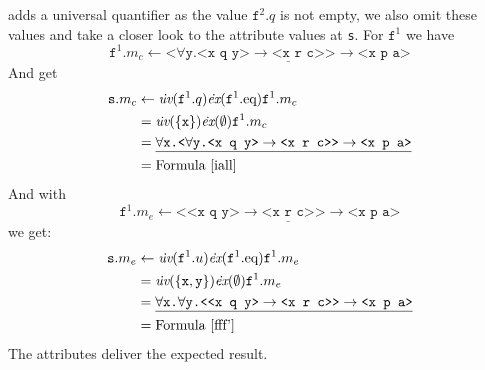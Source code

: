 adds a universal quantifier as the value $\texttt{f}^2.q$ is not empty, we also omit these values and take a closer look to the attribute values at \texttt{s}.
For $\texttt{f}^1$ we have \[\texttt{f}^1.m_c\leftarrow \underline{\texttt{<}\forall \texttt{y.<x q y>}\rightarrow\texttt{<x r c>{}>}\rightarrow \texttt{<x p a>}}\]
And get
\begin{align*}
\notag \texttt{s}.m_c&\leftarrow \dot{\textit{uv}}(\texttt{f}^1.q) \dot{\textit{ex}}(\texttt{f}^1.\text{eq}) \texttt{f}^1.m_c\\
\notag &=\dot{\textit{uv}}(\{\texttt{x}\}) \dot{\textit{ex}}(\emptyset) \texttt{f}^1.m_c\\
\notag &= \underline{\forall \texttt{x.}\texttt{<}\forall \texttt{y.<x q y>}\rightarrow\texttt{<x r c>{}>}\rightarrow\texttt{<x p a>}}\\
\notag &= \text{Formula~\ref{iall}}
\end{align*}
And with \[\texttt{f}^1.m_e\leftarrow \underline{\texttt{<{}<x q y>}\rightarrow\texttt{<x r c>{}>}\rightarrow\texttt{<x p a>}}\]
we get:
\begin{align*}
\notag \texttt{s}.m_e&\leftarrow \dot{\textit{uv}}(\texttt{f}^1.u) \dot{\textit{ex}}(\texttt{f}^1.\text{eq}) \texttt{f}^1.m_e\\
\notag &=\dot{\textit{uv}}(\{\texttt{x}, \texttt{y}\}) \dot{\textit{ex}}(\emptyset) \texttt{f}^1.m_e\\
\notag &= \underline{\forall \texttt{x.}\forall\texttt{y.}\texttt{<{}<x q y>}\rightarrow\texttt{<x r c>{}>}\rightarrow \texttt{<x p a>}}\\
\notag &= \text{Formula~\ref{fff'}}
\end{align*}
The attributes deliver the expected result.


